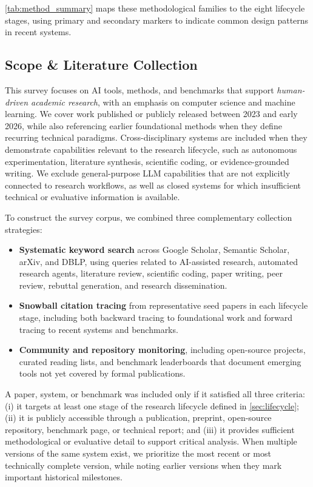 \cref{tab:method_summary} maps these methodological families to the eight lifecycle stages, using primary and secondary markers to indicate common design patterns in recent systems. 





\subsection{Scope \& Literature Collection}
\label{sec:scope}

This survey focuses on AI tools, methods, and benchmarks that support \emph{human-driven academic research}, with an emphasis on computer science and machine learning. We cover work published or publicly released between 2023 and early 2026, while also referencing earlier foundational methods when they define recurring technical paradigms. Cross-disciplinary systems are included when they demonstrate capabilities relevant to the research lifecycle, such as autonomous experimentation, literature synthesis, scientific coding, or evidence-grounded writing. We exclude general-purpose LLM capabilities that are not explicitly connected to research workflows, as well as closed systems for which insufficient technical or evaluative information is available.

To construct the survey corpus, we combined three complementary collection strategies:
\begin{itemize}
    \item \textbf{Systematic keyword search} across Google Scholar, Semantic Scholar, arXiv, and DBLP, using queries related to AI-assisted research, automated research agents, literature review, scientific coding, paper writing, peer review, rebuttal generation, and research dissemination.

    \item \textbf{Snowball citation tracing} from representative seed papers in each lifecycle stage, including both backward tracing to foundational work and forward tracing to recent systems and benchmarks.

    \item \textbf{Community and repository monitoring}, including open-source projects, curated reading lists, and benchmark leaderboards that document emerging tools not yet covered by formal publications.
\end{itemize}


A paper, system, or benchmark was included only if it satisfied all three criteria: (i) it targets at least one stage of the research lifecycle defined in \cref{sec:lifecycle}; (ii) it is publicly accessible through a publication, preprint, open-source repository, benchmark page, or technical report; and (iii) it provides sufficient methodological or evaluative detail to support critical analysis. When multiple versions of the same system exist, we prioritize the most recent or most technically complete version, while noting earlier versions when they mark important historical milestones.

